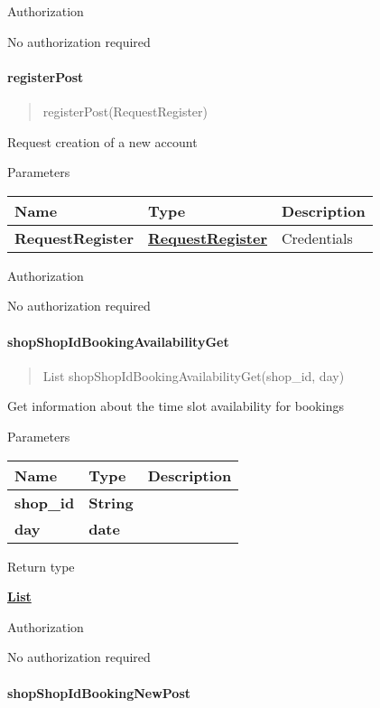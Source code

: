 Authorization

No authorization required

\hypertarget{registerpost}{%
\paragraph{\texorpdfstring{\textbf{registerPost}}{registerPost}}\label{registerpost}}

\begin{quote}
registerPost(RequestRegister)
\end{quote}

Request creation of a new account

Parameters

\begin{longtable}[]{@{}lll@{}}
\toprule
Name & Type & Description\tabularnewline
\midrule
\endhead
\textbf{RequestRegister} &
\href{../Models/RequestRegister.md}{\textbf{RequestRegister}} &
Credentials\tabularnewline
\bottomrule
\end{longtable}

Authorization

No authorization required

\hypertarget{shopshopidbookingavailabilityget}{%
\paragraph{\texorpdfstring{\textbf{shopShopIdBookingAvailabilityGet}}{shopShopIdBookingAvailabilityGet}}\label{shopshopidbookingavailabilityget}}

\begin{quote}
List shopShopIdBookingAvailabilityGet(shop\_id, day)
\end{quote}

Get information about the time slot availability for bookings

Parameters

\begin{longtable}[]{@{}lll@{}}
\toprule
Name & Type & Description\tabularnewline
\midrule
\endhead
\textbf{shop\_id} & \textbf{String} &\tabularnewline
\textbf{day} & \textbf{date} &\tabularnewline
\bottomrule
\end{longtable}

Return type

\href{../Models/object.md}{\textbf{List}}

Authorization

No authorization required

\hypertarget{shopshopidbookingnewpost}{%
\paragraph{\texorpdfstring{\textbf{shopShopIdBookingNewPost}}{shopShopIdBookingNewPost}}\label{shopshopidbookingnewpost}}

